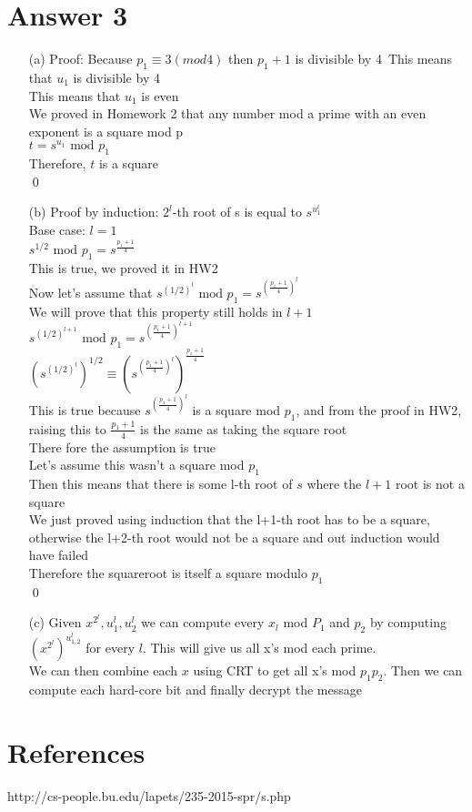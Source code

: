 \documentclass[11pt]{article}
\theoremstyle{definition}
\begin{document}
\section*{Answer 3}
\begin{enumerate}
\item[(a)]
Proof: Because $p_1 \equiv 3 (mod 4)$ then $p_1 + 1$ is divisible by 4\
This means that $u_1$ is divisible by 4\\
This means that $u_1$ is even\\
We proved in Homework 2 that any number mod a prime with an even exponent is a square mod p\\
$t = s^{u_1} \text{ mod } p_1$\\
Therefore, $t$ is a square\\
\qed

\item[(b)]
Proof by induction: $2^l$-th root of s is equal to $s^{u_1^l}$\\
Base case: $l = 1$\\
$s^{1/2} \text{ mod } p_1 = s^{\frac{p_1 + 1}{4}}$\\
This is true, we proved it in HW2\\
Now let's assume that $s^{(1/2)^l} \text{ mod } p_1 = s^{(\frac{p_1 + 1}{4})^l}$\\
We will prove that this property still holds in $l+1$\\
$s^{(1/2)^{l+1}} \text{ mod } p_1 = s^{(\frac{p_1 + 1}{4})^{l+1}}$\\
$(s^{(1/2)^l})^{1/2} \equiv (s^{(\frac{p_1 + 1}{4})^l})^{\frac{p_1 + 1}{4}}$\\ 
This is true because $s^{(\frac{p_1 + 1}{4})^l}$ is a square mod $p_1$, and from the proof in HW2, raising this to $\frac{p_1 + 1}{4}$ is the same as taking the square root\\
There fore the assumption is true\\

Let's assume this wasn't a square mod $p_1$\\
Then this means that there is some l-th root of $s$ where the $l+1$ root is not a square\\
We just proved using induction that the l+1-th root has to be a square, otherwise the l+2-th root would not be a square and out induction would have failed\\
Therefore the squareroot is itself a square modulo $p_1$\\
\qed

\item[(c)]
Given $x^{2^l}, u^l_1, u^l_2$ we can compute every $x_l$ mod $P_1$ and $p_2$ by computing $(x^{2^l})^{u^l_{1,2}}$ for every $l$.  This will give us all x's mod each prime.\\
We can then combine each $x$ using CRT to get all x's mod $p_1p_2$.  Then we can compute each hard-core bit and finally decrypt the message\\

\end{enumerate}




\noindent\hrulefill


\section*{References}

http://cs-people.bu.edu/lapets/235-2015-spr/s.php
\end{document}
